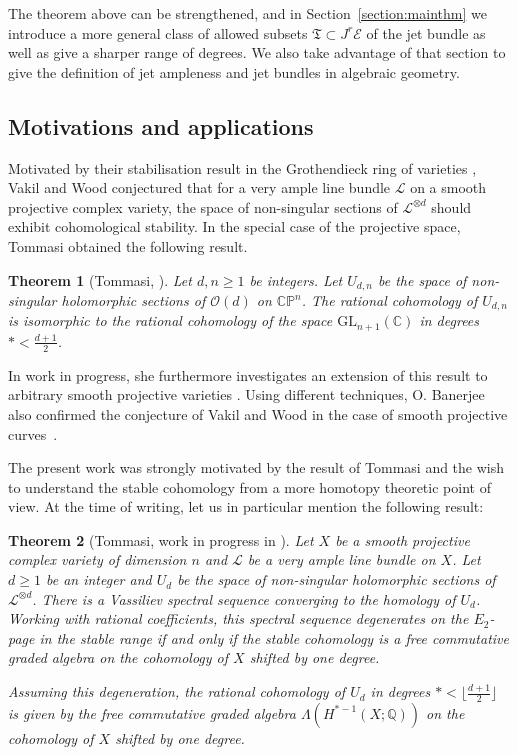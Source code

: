\documentclass[a4paper]{amsart}
\newcommand{\bQ}{\mathbb Q}
\newcommand{\bC}{\mathbb C}
\newcommand{\bP}{\mathbb P}
\newcommand{\cE}{\mathcal E}
\newcommand{\cL}{\mathcal L}
\newcommand{\cO}{\mathcal O}
\newcommand{\fT}{\mathfrak T}
\theoremstyle{plain}
\newtheorem{theorem}{Theorem}[section]
\theoremstyle{definition}
\begin{document}
The theorem above can be strengthened, and in Section~\ref{section:mainthm} we introduce a more general class of allowed subsets $\fT \subset J^r\cE$ of the jet bundle as well as give a sharper range of degrees. We also take advantage of that section to give the definition of jet ampleness and jet bundles in algebraic geometry.

\subsection{Motivations and applications}

Motivated by their stabilisation result in the Grothendieck ring of varieties \cite{vakil_discriminants_2015}, Vakil and Wood conjectured that for a very ample line bundle $\cL$ on a smooth projective complex variety, the space of non-singular sections of $\cL^{\otimes d}$ should exhibit cohomological stability. In the special case of the projective space, Tommasi obtained the following result.
\begin{theorem}[Tommasi, \cite{tommasi_stable_2014}]
Let $d,n \geq 1$ be integers. Let $U_{d,n}$ be the space of non-singular holomorphic sections of $\cO(d)$ on $\bC\bP^n$. The rational cohomology of $U_{d,n}$ is isomorphic to the rational cohomology of the space $\mathrm{GL}_{n+1}(\bC)$ in degrees $* < \frac{d+1}{2}$.
\end{theorem}
\noindent In work in progress, she furthermore investigates an extension of this result to arbitrary smooth projective varieties \cite{tommasi_stable_nodate}. Using different techniques, O. Banerjee also confirmed the conjecture of Vakil and Wood in the case of smooth projective curves~\cite{banerjee_filtration_2021}.

The present work was strongly motivated by the result of Tommasi and the wish to understand the stable cohomology from a more homotopy theoretic point of view. At the time of writing, let us in particular mention the following result:
\begin{theorem}[Tommasi, work in progress in \cite{tommasi_stable_nodate}]
Let $X$ be a smooth projective complex variety of dimension $n$ and $\cL$ be a very ample line bundle on $X$. Let $d \geq 1$ be an integer and $U_d$ be the space of non-singular holomorphic sections of $\cL^{\otimes d}$. There is a Vassiliev spectral sequence converging to the homology of $U_d$. Working with rational coefficients, this spectral sequence degenerates on the $E_2$-page in the stable range if and only if the stable cohomology is a free commutative graded algebra on the cohomology of $X$ shifted by one degree.

Assuming this degeneration, the rational cohomology of $U_d$ in degrees $* < \lfloor\frac{d+1}{2}\rfloor$ is given by the free commutative graded algebra $\Lambda\left(H^{*-1}(X; \bQ) \right)$ on the cohomology of $X$ shifted by one degree.
\end{theorem}
\end{document}
